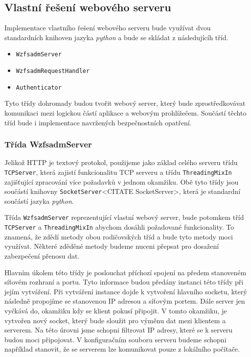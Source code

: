    \subsection{Vlastní řešení webového serveru}
    Implementace vlastního řešení webového serveru bude využívat dvou standardních knihoven jazyka \emph{python} a bude se skládat z následujícíh tříd.
    \begin{itemize}
      \item \verb|WzfsadmServer|
      \item \verb|WzfsadmRequestHandler|
      \item \verb|Authenticator|
    \end{itemize}

    Tyto třídy dohromady budou tvořit webový server, který bude zprostředkovávat komunikaci mezi logickou částí aplikace a webovým prohlížečem. Součástí těchto tříd bude i implementace navržených bezpečnostních opatření.
    \subsubsection{Třída WzfsadmServer}
    Jelikož HTTP je textový protokol, použijeme jako základ celého serveru  třídu \verb|TCPServer|, která zajistí funkcionalitu TCP serveru a třídu \verb|ThreadingMixIn| zajišťující zpracování více požadavků v jednom okamžiku. Obě tyto třídy jsou součástí knihovny \verb|SocketServer|<CITATE SocketServer>, která je standardní součástí jazyka \emph{python}.

    Třída \verb|WzfsadmServer| reprezentující vlastní webový server, bude potomkem tříd \verb|TCPServer| a \verb|ThreadingMixIn| abychom dosáhli požadované funkcionality. To znamená, že zdědí metody obou rodičovských tříd a bude tyto metody moci využívat. Některé zděděné metody budeme nuceni přepsat pro dosažení zabezpečení přenosu dat.

    Hlavním úkolem této třídy je poslouchat příchozí spojení na předem stanoveném síťovém rozhraní a portu. Tyto informace budou předány instanci této třídy při jejím vytváření. Při vytváření instance dojde k vytvoření hlavního socketu, který následně propojíme se stanovenou IP adresou a síťovým portem. Dále server jen vyčkává do, okamžiku kdy se klient pokusí připojit. V tomto okamžiku, je vytvořen nový socket, který bude sloužit pro výměnu dat mezi klientem a serverem. Na této úrovni jsme schopni filtrovat IP adresy, které se k serveru budou moci připojovat. V konfiguračním souboru serveru budeme schopni například stanovit, že se serverem lze komunikovat pouze z lokálního počítače.

